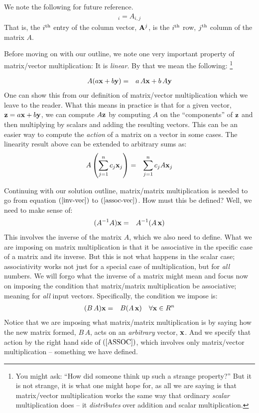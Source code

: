 \documentclass{article}
\begin{document}
We note the following for future reference.
\begin{eqnarray}
	[{\bf A}^j]_i = A_{i, j} \label{vec-matrix-index}
\end{eqnarray}
That is, the $i^{\rm th}$ entry of the column vector, ${\bf A}^j$, is the
$i^{\rm th}$ row,  $j^{\rm th}$ column of the matrix $A$. 

Before moving on with our outline, we note one very important property of 
matrix/vector multiplication: It is {\em linear\/}.
By that we mean the following:%
\footnote{You might ask: ``How did someone think up such a 
strange property?'' But it is not strange, it is what one might hope for, as all we
are saying is that matrix/vector multiplication works the same way that ordinary {\em scalar\/} 
multiplication does -- it {\em distributes\/} over addition and scalar multiplication.} 

\begin{eqnarray}
	A( a {\bf x} + b{\bf y} ) & = & a\, A{\bf x} + b\, A{\bf y}
\end{eqnarray}
One can show this from our definition of matrix/vector multiplication which we
leave to the reader. What this means in practice is that for a given vector, ${\bf z} = a{\bf x} + b{\bf y}$,
we can compute $A {\bf z}$ by computing $A$ on the ``components'' of ${\bf z}$ and then multiplying by scalars and adding
the resulting vectors.
This can be an easier way to compute the {\em action\/} of a matrix on a vector in some cases.
The linearity result above can be extended to arbitrary sums as:
\begin{eqnarray}
	A\left( \sum_{j=1}^n c_j {\bf x}_j \right) & = & \sum_{j=1}^n c_j A {\bf x}_j \label{linearity}
\end{eqnarray}

Continuing with our solution outline, matrix/matrix multiplication is needed
to go from equation $(\ref{inv-vec})$ to $(\ref{assoc-vec})$. How must this be defined?
Well, we need to make sense of:
\begin{eqnarray}
  (A^{-1} A) {\bf x} & = & A^{-1} (A \, {\bf x}) 
\end{eqnarray}
This involves the inverse of the matrix $A$, which we also need to define. 
What we are imposing on matrix multiplication is that it be associative in the
specific case of a matrix and its inverse. But this is not what happens in the scalar case;
associativity works not just for a special case of multiplication, but for {\em all\/} numbers.
We will forgo what the inverse of a matrix might mean and focus now on imposing the 
condition that matrix/matrix multiplication be associative; meaning for {\em all\/} input vectors.
Specifically, the condition we impose is:
\begin{eqnarray}
	(B\, A) {\bf x} & = & B (A \, {\bf x}) \quad \forall {\bf x} \in R^n \label{ASSOC}
\end{eqnarray}
Notice that we are imposing what matrix/matrix multiplication is by saying how the 
new matrix formed, $B \, A$, acts on an {\em arbitrary\/} vector, ${\bf x}$. And we 
specify that action by the right hand side of $(\ref{ASSOC})$, which involves only matrix/vector
multiplication -- something we have defined.
\end{document}
